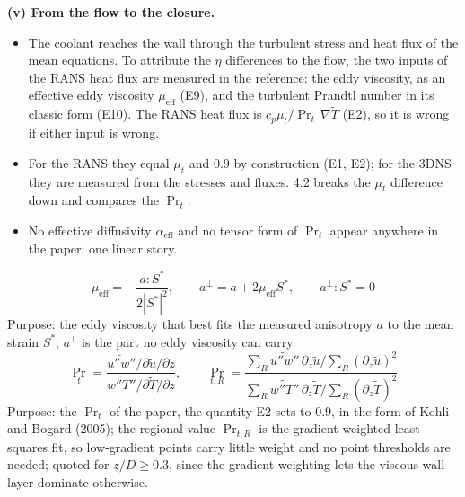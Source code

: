 \documentclass[10pt]{article}
\begin{document}
\textbf{(v) From the flow to the closure.}
\begin{itemize}
\item The coolant reaches the wall through the turbulent stress and heat flux of the mean equations. To attribute
  the $\eta$ differences to the flow, the two inputs of the RANS heat flux are measured in the reference: the
  eddy viscosity, as an effective eddy viscosity $\mu_{\mathrm{eff}}$ (E9), and the turbulent Prandtl number in
  its classic form (E10). The RANS heat flux is $c_p\mu_t/\Pr_t\,\nabla\tilde T$ (E2), so it is wrong if either
  input is wrong.
\item For the RANS they equal $\mu_t$ and 0.9 by construction (E1, E2); for the 3DNS they are measured from the
  stresses and fluxes. 4.2 breaks the $\mu_t$ difference down and compares the $\Pr_t$.
\item No effective diffusivity $\alpha_{\mathrm{eff}}$ and no tensor form of $\Pr_t$ appear anywhere in the
  paper; one linear story.
\end{itemize}
\begin{equation}
\mu_{\mathrm{eff}}=-\frac{a\!:\!S^{*}}{2|S^{*}|^2},\qquad a^{\perp}=a+2\mu_{\mathrm{eff}}S^{*},\qquad a^{\perp}\!:\!S^{*}=0
\tag{E9}
\end{equation}
Purpose: the eddy viscosity that best fits the measured anisotropy $a$ to the mean strain $S^{*}$; $a^\perp$ is
the part no eddy viscosity can carry.
\begin{equation}
\Pr_t=\frac{\widetilde{u''w''}\big/\partial\tilde u/\partial z}{\widetilde{w''T''}\big/\partial\tilde T/\partial z},\qquad
\Pr_{t,R}=\frac{\sum_R\widetilde{u''w''}\,\partial_z\tilde u\big/\sum_R(\partial_z\tilde u)^2}
{\sum_R\widetilde{w''T''}\,\partial_z\tilde T\big/\sum_R(\partial_z\tilde T)^2}
\tag{E10}
\end{equation}
Purpose: the $\Pr_t$ of the paper, the quantity E2 sets to 0.9, in the form of Kohli and Bogard (2005); the
regional value $\Pr_{t,R}$ is the gradient-weighted least-squares fit, so low-gradient points carry little weight
and no point thresholds are needed; quoted for $z/D\ge0.3$, since the gradient weighting lets the viscous wall
layer dominate otherwise.
\end{document}
